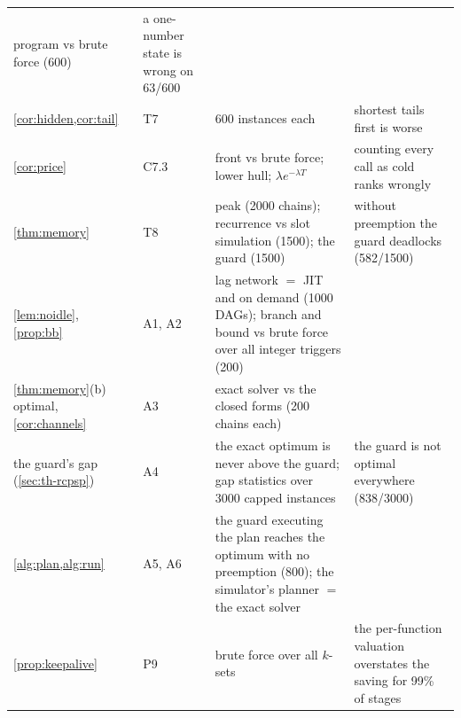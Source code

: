 \begin{table}[t]
\begin{tabular}{@{}p{}p{}p{}p{}@{}}
  program vs brute force (600) & a one-number state is wrong on 63/600 \\
\cref{cor:hidden,cor:tail} & T7 & 600 instances each & shortest tails first is worse \\
\cref{cor:price} & C7.3 & front vs brute force; lower hull; $\lambda e^{-\lambda T}$ & counting
  every call as cold ranks wrongly \\
\cref{thm:memory} & T8 & peak (2000 chains); recurrence vs slot simulation (1500); the guard
  (1500) & without preemption the guard deadlocks (582/1500) \\
\cref{lem:noidle}, \cref{prop:bb} & A1, A2 & lag network $=$ JIT and on demand (1000 DAGs);
  branch and bound vs brute force over all integer triggers (200) & \\
\cref{thm:memory}(b) optimal, \cref{cor:channels} & A3 & exact solver vs the closed forms (200 chains
  each) & \\
the guard's gap (\cref{sec:th-rcpsp}) & A4 & the exact optimum is never above the guard; gap
  statistics over 3000 capped instances & the guard is not optimal everywhere (838/3000) \\
\cref{alg:plan,alg:run} & A5, A6 & the guard executing the plan reaches the optimum with no
  preemption (800); the simulator's planner $=$ the exact solver & \\
\cref{prop:keepalive} & P9 & brute force over all $k$-sets & the per-function valuation
  overstates the saving for 99\% of stages \\
\bottomrule
\end{tabular}
\end{table}

